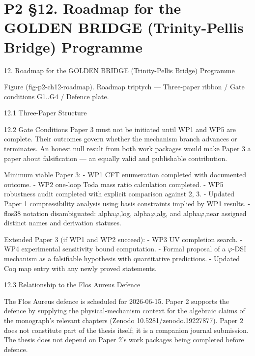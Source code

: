 
\section{P2 §12. Roadmap for the GOLDEN BRIDGE (Trinity-Pellis Bridge) Programme}

12. Roadmap for the GOLDEN BRIDGE (Trinity-Pellis Bridge) Programme

   Figure (fig-p2-ch12-roadmap). Roadmap triptych --- Three-paper ribbon / Gate conditions G1..G4
                                        / Defence plate.

  12.1 Three-Paper Structure

  12.2 Gate Conditions
  Paper 3 must not be initiated until WP1 and WP5 are complete. Their outcomes govern
  whether the mechanism branch advances or terminates. An honest null result from both
  work packages would make Paper 3 a paper about falsification --- an equally valid and
  publishable contribution.

  Minimum viable Paper 3:
  - WP1 CFT enumeration completed with documented outcome.
  - WP2 one-loop Toda mass ratio calculation completed.
  - WP5 robustness audit completed with explicit comparison against 2, 3.
  - Updated Paper 1 compressibility analysis using basis constraints implied by WP1
  results.
  - flos38 notation disambiguated: alpha$\varphi$,log, alpha$\varphi$,alg, and alpha$\varphi$,near assigned
  distinct names and derivation statuses.

  Extended Paper 3 (if WP1 and WP2 succeed):
  - WP3 UV completion search.
  - WP4 experimental sensitivity bound computation.
  - Formal proposal of a $\varphi$-DSI mechanism as a falsifiable hypothesis with quantitative
  predictions.
  - Updated Coq map entry with any newly proved statements.

  12.3 Relationship to the Flos Aureus Defence

  The Flos Aureus defence is scheduled for 2026-06-15. Paper 2 supports the defence by
  supplying the physical-mechanism context for the algebraic claims of the monograph's
  relevant chapters (Zenodo 10.5281/zenodo.19227877). Paper 2 does not constitute part
  of the thesis itself; it is a companion journal submission. The thesis does not depend on
  Paper 2's work packages being completed before defence.